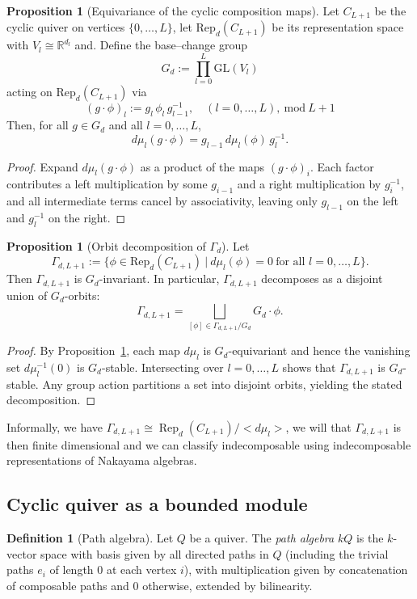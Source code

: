 \documentclass{article}
\newcommand{\Rep}{\operatorname{Rep}}
\theoremstyle{definition}
\newtheorem{proposition}[theorem]{Proposition}
\newtheorem{definition}[theorem]{Definition}
\begin{document}
\begin{proposition}[Equivariance of the cyclic composition maps]\label{prop:mu-equivariant}
Let $C_{L+1}$ be the cyclic quiver on vertices $\{0,\ldots,L\}$, let $\mathrm{Rep}_{d}(C_{L+1})$ be its representation space with
$V_l\cong\mathbb{R}^{d_l}$ and. Define the base--change group
\[
G_d:=\prod_{l=0}^{L} \mathrm{GL}(V_l)
\]
acting on $\mathrm{Rep}_{d}(C_{L+1})$ via
\[
(g\cdot \phi)_l := g_l\,\phi_l\,g_{l-1}^{-1},\quad (l=0,\ldots,L), \ \text{mod} \ L+1
\]
Then, for all $g\in G_d$ and all $l=0,\ldots,L$,
\[
d\mu_l(g\cdot \phi) = g_{l-1}\,d\mu_l(\phi)\,g_{l}^{-1}.
\]
\end{proposition}

\begin{proof}
Expand $d\mu_l(g\cdot\phi)$ as a product of the maps $(g\cdot\phi)_i$. Each factor contributes a left multiplication by some $g_{i-1}$ and a right multiplication by $g_{i}^{-1}$, and all intermediate terms cancel by associativity, leaving only $g_{l-1}$ on the left and $g_{l}^{-1}$ on the right.
\end{proof}

\begin{proposition}[Orbit decomposition of $\Gamma_d$]\label{prop:GammaC-orbits}
Let
\[
\Gamma_{d,L+1}:=\Big\{\phi\in \mathrm{Rep}_{d}(C_{L+1})\ \Big|\ d\mu_l(\phi)=0\ \text{for all }l=0,\ldots,L\Big\}.
\]
Then $\Gamma_{d,L+1}$ is $G_d$-invariant. In particular, $\Gamma_{d,L+1}$ decomposes as a disjoint union of $G_d$-orbits:
\[
\Gamma_{d,L+1} = \bigsqcup_{[\phi]\in \Gamma_{d,L+1}/G_d} G_d\cdot \phi .
\]
\end{proposition}

\begin{proof}
By Proposition~\ref{prop:mu-equivariant}, each map $d\mu_l$ is $G_d$-equivariant and hence the vanishing set $d\mu_l^{-1}(0)$ is $G_d$-stable. Intersecting over $l=0,\ldots,L$ shows that $\Gamma_{d,L+1}$ is $G_d$-stable. Any group action partitions a set into disjoint orbits, yielding the stated decomposition.
\end{proof}
\noindent
Informally, we have $\Gamma_{d,L+1}\cong \Rep_d(C_{L+1})/< d\mu_l > $, we will that $\Gamma_{d,L+1}$ is then finite dimensional and we can classify indecomposable using indecomposable representations of Nakayama algebras.
\subsection{Cyclic quiver as a bounded module}
\begin{definition}[Path algebra]
Let $Q$ be a quiver. The \emph{path algebra} $kQ$ is the $k$-vector space with basis given by all directed paths in $Q$ (including the trivial paths $e_i$ of length $0$ at each vertex $i$), with multiplication given by concatenation of composable paths and $0$ otherwise, extended by bilinearity.
\end{definition}
\end{document}
